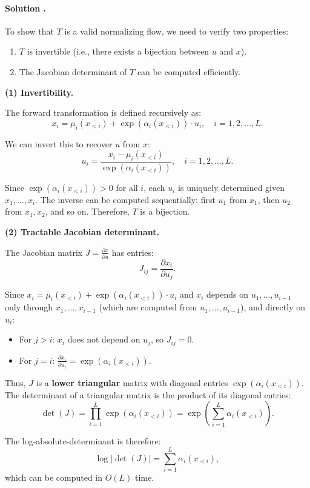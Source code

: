 \documentclass{article}
\newcounter{solutionCount}
\newcommand{\solution}[1]{
    \stepcounter{solutionCount}
    \paragraph{Solution \thesolutionCount.}
    {
        #1
    }
}
\begin{document}
\solution{
    To show that $T$ is a valid normalizing flow, we need to verify two properties:
    \begin{enumerate}
        \item $T$ is invertible (i.e., there exists a bijection between $u$ and $x$).
        \item The Jacobian determinant of $T$ can be computed efficiently.
    \end{enumerate}

    \textbf{(1) Invertibility.}

    The forward transformation is defined recursively as:
    \[
      x_i = \mu_i(x_{<i}) + \exp(\alpha_i(x_{<i})) \cdot u_i, \quad i = 1, 2, \ldots, L.
    \]

    We can invert this to recover $u$ from $x$:
    \[
      u_i = \frac{x_i - \mu_i(x_{<i})}{\exp(\alpha_i(x_{<i}))}, \quad i = 1, 2, \ldots, L.
    \]

    Since $\exp(\alpha_i(x_{<i})) > 0$ for all $i$, each $u_i$ is uniquely determined given $x_1, \ldots, x_i$. The inverse can be computed sequentially: first $u_1$ from $x_1$, then $u_2$ from $x_1, x_2$, and so on. Therefore, $T$ is a bijection.

    \textbf{(2) Tractable Jacobian determinant.}

    The Jacobian matrix $J = \frac{\partial x}{\partial u}$ has entries:
    \[
      J_{ij} = \frac{\partial x_i}{\partial u_j}.
    \]

    Since $x_i = \mu_i(x_{<i}) + \exp(\alpha_i(x_{<i})) \cdot u_i$ and $x_i$ depends on $u_1, \ldots, u_{i-1}$ only through $x_1, \ldots, x_{i-1}$ (which are computed from $u_1, \ldots, u_{i-1}$), and directly on $u_i$:
    \begin{itemize}
        \item For $j > i$: $x_i$ does not depend on $u_j$, so $J_{ij} = 0$.
        \item For $j = i$: $\frac{\partial x_i}{\partial u_i} = \exp(\alpha_i(x_{<i}))$.
    \end{itemize}

    Thus, $J$ is a \textbf{lower triangular} matrix with diagonal entries $\exp(\alpha_i(x_{<i}))$. The determinant of a triangular matrix is the product of its diagonal entries:
    \[
      \det(J) = \prod_{i=1}^{L} \exp(\alpha_i(x_{<i})) = \exp\left(\sum_{i=1}^{L} \alpha_i(x_{<i})\right).
    \]

    The log-absolute-determinant is therefore:
    \[
      \log |\det(J)| = \sum_{i=1}^{L} \alpha_i(x_{<i}),
    \]
    which can be computed in $O(L)$ time.

}
\end{document}
